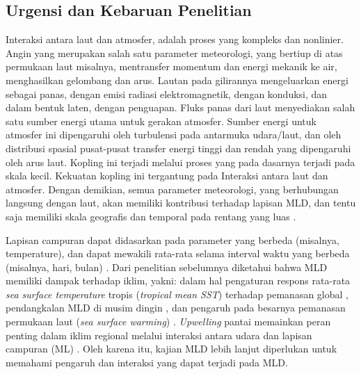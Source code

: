 \begin{spacing}{1.5}
	\section[Urgensi dan Kebaruan Penelitian]{Urgensi dan Kebaruan Penelitian}

	Interaksi antara laut dan atmosfer, adalah proses yang kompleks dan nonlinier. Angin yang merupakan salah satu parameter meteorologi, yang bertiup di atas permukaan laut misalnya, mentransfer momentum dan energi mekanik ke air, menghasilkan gelombang dan arus. Lautan pada gilirannya mengeluarkan energi sebagai panas, dengan emisi radiasi elektromagnetik, dengan konduksi, dan dalam bentuk laten, dengan penguapan. Fluks panas dari laut menyediakan salah satu sumber energi utama untuk gerakan atmosfer. Sumber energi untuk atmosfer ini dipengaruhi oleh turbulensi pada antarmuka udara/laut, dan oleh distribusi spasial pusat-pusat transfer energi tinggi dan rendah yang dipengaruhi oleh arus laut. Kopling ini terjadi melalui proses yang pada dasarnya terjadi pada skala kecil. Kekuatan kopling ini tergantung pada Interaksi antara laut dan atmosfer. Dengan demikian, semua parameter meteorologi, yang berhubungan langsung dengan laut, akan memiliki kontribusi terhadap lapisan MLD, dan tentu saja memiliki skala geografis dan temporal pada rentang yang luas .
	
	Lapisan campuran dapat didasarkan pada parameter yang berbeda (misalnya, temperature), dan dapat mewakili rata-rata selama interval waktu yang berbeda (misalnya, hari, bulan) . Dari penelitian sebelumnya diketahui bahwa MLD memiliki dampak terhadap iklim, yakni: dalam hal pengaturan respons rata-rata \textit{sea surface temperature} tropis (\textit{tropical mean SST}) terhadap pemanasan global , pendangkalan MLD di musim dingin , dan pengaruh pada besarnya pemanasan permukaan laut (\textit{sea surface warming}) . \textit{Upwelling} pantai memainkan peran penting dalam iklim regional melalui interaksi antara udara dan lapisan campuran (ML) . Oleh karena itu, kajian MLD lebih lanjut diperlukan untuk memahami pengaruh dan interaksi yang dapat terjadi pada MLD.
	

\end{spacing}
